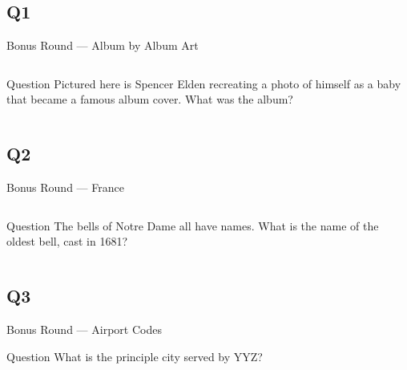 \documentclass[11pt]{beamer}
\begin{document}
\subsection*{Q1}
\begin{frame}[t]{Bonus Round --- Album by Album Art}
\begin{columns}[T,totalwidth=\linewidth]
\begin{column}{0.32\linewidth}
\begin{block}{Question}
Pictured here is Spencer Elden recreating a photo of himself as a baby that became a famous album cover. What was the album?
\end{block}
\end{column}
\begin{column}{0.65\linewidth}
\begin{center}
\texttt{[image: \{Images/nevermind]}.jpg}
\end{center}
\end{column}
\end{columns}
\end{frame}
\subsection*{Q2}
\begin{frame}[t]{Bonus Round --- France}
\begin{columns}[T,totalwidth=\linewidth]
\begin{column}{0.32\linewidth}
\begin{block}{Question}
The bells of Notre Dame all have names.  What is the name of the oldest bell, cast in 1681?
\end{block}
\end{column}
\begin{column}{0.65\linewidth}
\begin{center}
\texttt{[image: \{Images/emannuelbell]}.jpg}
\end{center}
\end{column}
\end{columns}
\end{frame}
\subsection*{Q3}
\begin{frame}[t]{Bonus Round --- Airport Codes}
\begin{block}{Question}
What is the principle city served by YYZ\@?
\end{block}
\end{frame}
\end{document}
